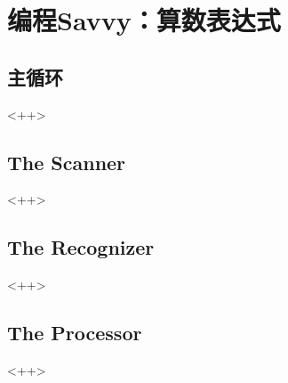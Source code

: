 

\chapter{编程Savvy：算数表达式}

\section{主循环}<++>

\section{The Scanner}<++>

\section{The Recognizer}<++>

\section{The Processor}<++>

